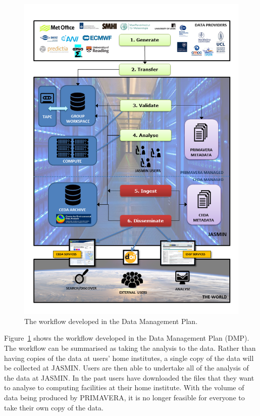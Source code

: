 \documentclass[gmd, manuscript]{copernicus}
\begin{document}
\begin{figure}[t]
\includegraphics[width=12cm]{original_dmp.png}
\caption{The workflow developed in the Data Management Plan.}
\label{dmp_workflow}
\end{figure}

Figure~\ref{dmp_workflow} shows the workflow developed in the Data Management Plan (DMP). The workflow can be summarised as taking the analysis to the data. Rather than having copies of the data at users' home institutes, a single copy of the data will be collected at JASMIN. Users are then able to undertake all of the analysis of the data at JASMIN. In the past users have downloaded the files that they want to analyse to computing facilities at their home institute. With the volume of data being produced by PRIMAVERA, it is no longer feasible for everyone to take their own copy of the data.
\end{document}
